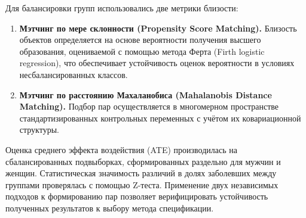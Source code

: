 \documentclass[a4paper,12pt]{article}
\begin{document}
Для балансировки групп использовались две метрики близости:
\begin{enumerate}
    \item \textbf{Мэтчинг по мере склонности (Propensity Score Matching).}
          Близость объектов определяется на основе вероятности получения высшего образования,
          оцениваемой с помощью метода Ферта (Firth logistic regression),
          что обеспечивает устойчивость оценок вероятности в условиях несбалансированных классов.
    \item \textbf{Мэтчинг по расстоянию Махаланобиса (Mahalanobis Distance Matching).}
          Подбор пар осуществляется в многомерном пространстве стандартизированных контрольных переменных
          с учётом их ковариационной структуры.
\end{enumerate}

Оценка среднего эффекта воздействия (ATE) производилась на сбалансированных подвыборках,
сформированных раздельно для мужчин и женщин.
Статистическая значимость различий в долях заболевших между группами проверялась с помощью Z-теста.
Применение двух независимых подходов к формированию пар позволяет верифицировать устойчивость полученных результатов
к выбору метода спецификации.
\end{document}
